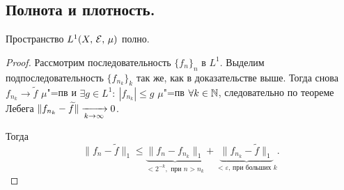 \subsection{Полнота и плотность.}

\begin{next0}
    Пространство $L^1(X,\, \mathcal{E},\, \mu)$ полно.

    \begin{proof}

        Рассмотрим последовательность $\{f_n\}_n$ в $L^1$. Выделим подпоследовательность
        $\{f_{n_k}\}_k$ так же, как в доказательстве выше.
        Тогда снова $f_{n_k}\to \widetilde{f}$ $\mu$"=пв и $\exists g\in L^1:\:
            |f_{n_k}|\leqslant g$ $\mu$"=пв $\forall k\in\mathbb{N}$, следовательно по теореме Лебега
        $\|f_{n_k}-\widetilde{f}\|\xrightarrow[k\to\infty]{}0$.

        Тогда \[
            \|f_n-\widetilde{f}\|_1\leqslant\underbrace{\|f_n-f_{n_k}\|_1}_{<2^{-k},\text{ при } n>n_k}+
            \underbrace{\|f_{n_k}-\widetilde{f}\|_1}_{<\varepsilon\text{, при больших } k}.
        \]

    \end{proof}
\end{next0}


